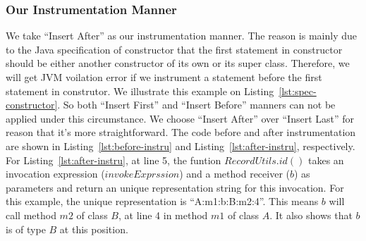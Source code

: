 \documentclass{fac}
\begin{document}
\subsubsection{Our Instrumentation Manner}\label{subsubsec:instrument}
We take ``Insert After'' as our instrumentation manner. The reason is mainly due to the Java specification of constructor that the first statement in constructor should be either another constructor of its own or its super class. Therefore, we will get JVM voilation error if we instrument a statement before the first statement in construtor. We illustrate this example on Listing~\ref{lst:spec-constructor}. So both ``Insert First'' and ``Insert Before'' manners can not be applied under this circumstance. We choose ``Insert After'' over ``Insert Last'' for reason that it's more straightforward. The code before and after instrumentation are shown in Listing~\ref{lst:before-instru} and Listing~\ref{lst:after-instru}, respectively. For Listing~\ref{lst:after-instru}, at line 5, the funtion $RecordUtils.id()$ takes an invocation expression ($invokeExprssion$) and a method receiver ($b$) as parameters and return an unique representation string for this invocation. For this example, the unique representation is ``A:m1:b:B:m2:4''. This means $b$ will call method $m2$ of class $B$, at line 4 in method $m1$ of class $A$. It also shows that $b$ is of type $B$ at this position.
\end{document}
